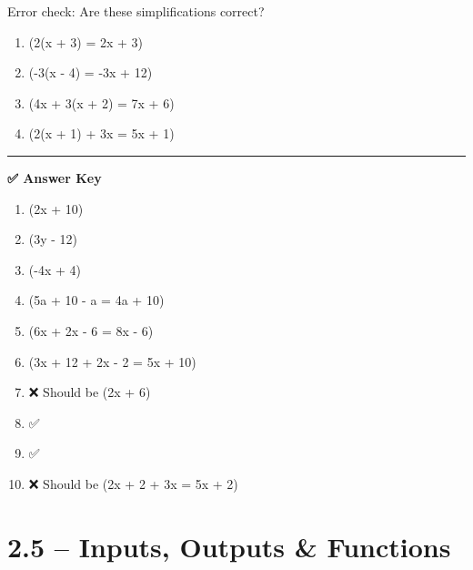 \documentclass[
  letterpaper,
  DIV=11,
  numbers=noendperiod]{scrreprt}
\providecommand{\tightlist}{%
  \setlength{\itemsep}{0pt}\setlength{\parskip}{0pt}}
\begin{document}
Error check: Are these simplifications correct?

\begin{enumerate}
\def\labelenumi{\arabic{enumi}.}
\setcounter{enumi}{6}
\tightlist
\item
  (2(x + 3) = 2x + 3)\\
\item
  (-3(x - 4) = -3x + 12)\\
\item
  (4x + 3(x + 2) = 7x + 6)\\
\item
  (2(x + 1) + 3x = 5x + 1)
\end{enumerate}

\begin{center}\rule{0.5\linewidth}{0.5pt}\end{center}

\textbf{✅ Answer Key}

\begin{enumerate}
\def\labelenumi{\arabic{enumi}.}
\item
  (2x + 10)\\
\item
  (3y - 12)\\
\item
  (-4x + 4)\\
\item
  (5a + 10 - a = 4a + 10)\\
\item
  (6x + 2x - 6 = 8x - 6)\\
\item
  (3x + 12 + 2x - 2 = 5x + 10)
\item
  ❌ Should be (2x + 6)\\
\item
  ✅\\
\item
  ✅\\
\item
  ❌ Should be (2x + 2 + 3x = 5x + 2)
\end{enumerate}

\chapter*{2.5 -- Inputs, Outputs \&
Functions}\label{inputs-outputs-functions}

\end{document}
